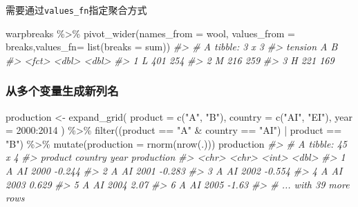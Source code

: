 \documentclass[
]{book}
\newenvironment{Shaded}{\begin{snugshade}}{\end{snugshade}}
\newcommand{\AttributeTok}[1]{\textcolor[rgb]{0.77,0.63,0.00}{#1}}
\newcommand{\CommentTok}[1]{\textcolor[rgb]{0.56,0.35,0.01}{\textit{#1}}}
\newcommand{\DecValTok}[1]{\textcolor[rgb]{0.00,0.00,0.81}{#1}}
\newcommand{\FunctionTok}[1]{\textcolor[rgb]{0.00,0.00,0.00}{#1}}
\newcommand{\NormalTok}[1]{#1}
\newcommand{\OtherTok}[1]{\textcolor[rgb]{0.56,0.35,0.01}{#1}}
\newcommand{\SpecialCharTok}[1]{\textcolor[rgb]{0.00,0.00,0.00}{#1}}
\newcommand{\StringTok}[1]{\textcolor[rgb]{0.31,0.60,0.02}{#1}}
\begin{document}
需要通过\texttt{values\_fn}指定聚合方式

\begin{Shaded}
\begin{Highlighting}[]
\NormalTok{warpbreaks }\SpecialCharTok{\%\textgreater{}\%} \FunctionTok{pivot\_wider}\NormalTok{(}\AttributeTok{names\_from =}\NormalTok{ wool, }\AttributeTok{values\_from =}\NormalTok{ breaks,}\AttributeTok{values\_fn=} \FunctionTok{list}\NormalTok{(}\AttributeTok{breaks =}\NormalTok{ sum))}
\CommentTok{\#\textgreater{} \# A tibble: 3 x 3}
\CommentTok{\#\textgreater{}   tension     A     B}
\CommentTok{\#\textgreater{}   \textless{}fct\textgreater{}   \textless{}dbl\textgreater{} \textless{}dbl\textgreater{}}
\CommentTok{\#\textgreater{} 1 L         401   254}
\CommentTok{\#\textgreater{} 2 M         216   259}
\CommentTok{\#\textgreater{} 3 H         221   169}
\end{Highlighting}
\end{Shaded}

\hypertarget{ux4eceux591aux4e2aux53d8ux91cfux751fux6210ux65b0ux5217ux540d}{%
\subsubsection{从多个变量生成新列名}\label{ux4eceux591aux4e2aux53d8ux91cfux751fux6210ux65b0ux5217ux540d}}

\begin{Shaded}
\begin{Highlighting}[]
\NormalTok{production }\OtherTok{\textless{}{-}} \FunctionTok{expand\_grid}\NormalTok{(}
    \AttributeTok{product =} \FunctionTok{c}\NormalTok{(}\StringTok{"A"}\NormalTok{, }\StringTok{"B"}\NormalTok{), }
    \AttributeTok{country =} \FunctionTok{c}\NormalTok{(}\StringTok{"AI"}\NormalTok{, }\StringTok{"EI"}\NormalTok{), }
    \AttributeTok{year =} \DecValTok{2000}\SpecialCharTok{:}\DecValTok{2014}
\NormalTok{  ) }\SpecialCharTok{\%\textgreater{}\%}
  \FunctionTok{filter}\NormalTok{((product }\SpecialCharTok{==} \StringTok{"A"} \SpecialCharTok{\&}\NormalTok{ country }\SpecialCharTok{==} \StringTok{"AI"}\NormalTok{) }\SpecialCharTok{|}\NormalTok{ product }\SpecialCharTok{==} \StringTok{"B"}\NormalTok{) }\SpecialCharTok{\%\textgreater{}\%} 
  \FunctionTok{mutate}\NormalTok{(}\AttributeTok{production =} \FunctionTok{rnorm}\NormalTok{(}\FunctionTok{nrow}\NormalTok{(.)))}
\NormalTok{production}
\CommentTok{\#\textgreater{} \# A tibble: 45 x 4}
\CommentTok{\#\textgreater{}   product country  year production}
\CommentTok{\#\textgreater{}   \textless{}chr\textgreater{}   \textless{}chr\textgreater{}   \textless{}int\textgreater{}      \textless{}dbl\textgreater{}}
\CommentTok{\#\textgreater{} 1 A       AI       2000     {-}0.244}
\CommentTok{\#\textgreater{} 2 A       AI       2001     {-}0.283}
\CommentTok{\#\textgreater{} 3 A       AI       2002     {-}0.554}
\CommentTok{\#\textgreater{} 4 A       AI       2003      0.629}
\CommentTok{\#\textgreater{} 5 A       AI       2004      2.07 }
\CommentTok{\#\textgreater{} 6 A       AI       2005     {-}1.63 }
\CommentTok{\#\textgreater{} \# ... with 39 more rows}
\end{Highlighting}
\end{Shaded}
\end{document}
